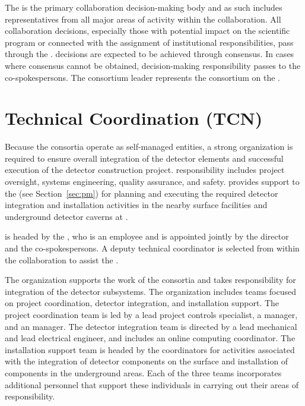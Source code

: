 
The   is the primary collaboration
decision-making body and as such includes representatives from all
major areas of activity within the collaboration.  All collaboration
decisions, especially those with potential impact on the 
scientific program or connected with the assignment of institutional
responsibilities, pass through the .   decisions
are expected to be achieved through consensus.  In cases where
consensus cannot be obtained, decision-making responsibility passes to
the co-spokespersons. The consortium leader represents the consortium
on the .

\section{Technical Coordination (TCN)}
\label{sec:tc}

Because the consortia operate as self-managed entities, a strong
 organization is required to ensure overall integration of
the detector elements and successful execution of the detector
construction project.   responsibility includes project
oversight, systems engineering, quality assurance, and safety.
 provides support to the  (see
Section~\ref{sec:pm}) for planning and executing the required detector
integration and installation activities in the nearby surface
facilities and underground detector caverns at \surf.

 is headed by the , who is an 
employee and is appointed jointly by the  director and the
 co-spokespersons.  A deputy technical coordinator is
selected from within the collaboration to assist the .

The  organization supports the work of the consortia and
takes responsibility for integration of the detector
subsystems.  The organization includes teams focused on project
coordination, detector integration, and installation support.  The
project coordination team is led by a lead project controls
specialist, a  manager, and an  manager.  The
detector integration team is directed by a lead mechanical and lead
electrical engineer, and includes an online computing coordinator.
The installation support team is headed by the coordinators for
activities associated with the integration of detector components on
the surface and installation of components in the underground areas.
Each of the three teams incorporates additional personnel that support
these individuals in carrying out their areas of responsibility.

